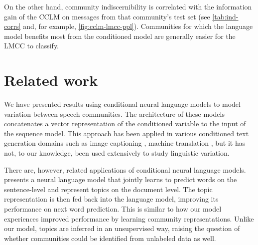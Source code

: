 \documentclass[11pt]{article}
\begin{document}

On the other hand, community indiscernibility is correlated with
the information gain of the CCLM
on messages from that community's test set
(see \cref{tab:ind-corrs} and, for example, \cref{fig:cclm-lmcc-ppl}).
Communities for which the language model benefits most from 
the conditioned model are generally easier for the LMCC to classify.




\section{Related work}

We have presented results using conditional neural language models
to model variation between speech communities.
The architecture of these models concatenates a vector representation
of the conditioned variable to the input of the sequence model.
This approach has been applied in various conditioned text generation domains such as 
image captioning \citep{Vinyals2015}, machine translation \citep{Kalchbrenner2013},
but it has not, to our knowledge, been used extensively to study linguistic variation.

There are, however, related applications of conditional neural language models.
\citet{Lau2017a} presents a neural language model that jointly learns to predict
words on the sentence-level and represent topics on the document level.
The topic representation is then fed back into the language model, 
improving its performance on next word prediction.
This is similar to how our model experiences improved performance
by learning community representations. 
Unlike our model, topics are inferred in an unsupervised way, 
raising the question of whether communities could be identified from 
unlabeled data as well.
\end{document}
